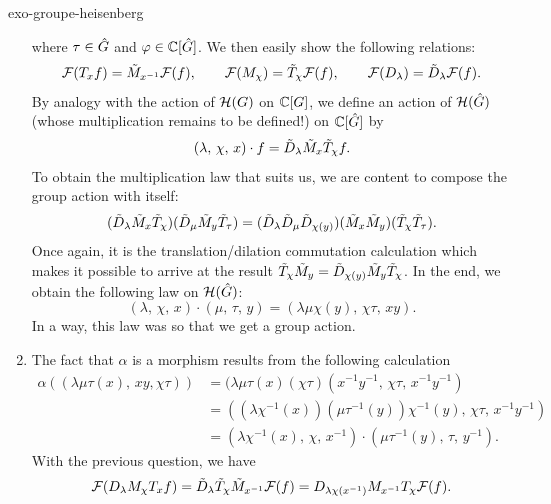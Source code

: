 \begin{correction}{exo-groupe-heisenberg}
\begin{enumerate}
\begin{equation*}
\end{equation*}
where $ \tau \in \hat{G} $ and $ \varphi \in \mathbb{C} [\hat{G}] $. We then easily show the following relations:
\begin{equation*}
\mathcal{F}(T_x f) = \tilde{M}_{x^{-1}} \mathcal{F}(f), \quad \quad \mathcal{F}(M_\chi) = \tilde{T}_\chi \mathcal{F}( f), \quad \quad \mathcal{F}(D_\lambda) = \tilde{D}_\lambda \mathcal{F}(f).
\end{equation*}
By analogy with the action of $ \mathcal{H} (G) $ on $ \mathbb{C} [G] $, we define an action of $ \mathcal{H} (\hat{G}) $ (whose multiplication remains to be defined!) on $ \mathbb{C} [\hat{G}] $ by
\begin{equation*}
(\lambda, \, \chi, \, x) \cdot f = \tilde{D}_\lambda \tilde{M}_x \tilde{T}_\chi f.
\end{equation*}
To obtain the multiplication law that suits us, we are content to compose the group action with itself:
\begin{equation*}
(\tilde{D}_\lambda \tilde{M}_x \tilde{T}_\chi) (\tilde{D}_\mu \tilde{M}_y \tilde{T}_\tau) = ( \tilde{D}_\lambda \tilde{D}_\mu \tilde{D}_{\chi (y)}) (\tilde{M}_x \tilde{M}_y) (\tilde{T}_\chi \tilde{T}_\tau).
\end{equation*}
Once again, it is the translation/dilation commutation calculation which makes it possible to arrive at the result $ \tilde{T}_\chi \tilde{M}_y = \tilde{D}_{\chi (y)} \tilde{M}_y \tilde{T}_\chi $. In the end, we obtain the following law on $ \mathcal{H} (\hat{G}) $:
\begin{equation*}
(\lambda, \, \chi, \, x) \cdot (\mu, \, \tau, \, y) = (\lambda \mu \chi (y), \, \chi \tau, \, xy ).
\end{equation*}
In a way, this law was  so that we get a group action.
\item The fact that $ \alpha $ is a morphism results from the following calculation
\begin{align*}
\alpha ((\lambda \mu \tau (x), \, xy, \chi \tau)) & = (\lambda \mu \tau (x) (\chi \tau) (x^{-1} y^{-1}, \, \chi \tau, \, x^{-1} y^{-1}) \\
& = \left((\lambda \chi^{-1} (x)) (\mu \tau^{-1} (y)) \chi^{-1} (y), \, \chi \tau , \, x^{-1} y^{-1} \right) \\
& = (\lambda \chi^{-1} (x), \, \chi, \, x^{-1}) \cdot (\mu \tau^{-1} (y), \, \tau , \, y^{-1}).
\end{align*}
With the previous question, we have
\begin{equation*}
\mathcal{F}(D_\lambda M_\chi T_x f) = \tilde{D}_\lambda \tilde{T}_\chi \tilde{M}_{x^{-1}} \mathcal{F}(f) = D_{\lambda \chi (x^{-1})} M_{x^{-1}} T_\chi \mathcal{F}(f).
\end{equation*}

\end{enumerate}
\end{correction}
